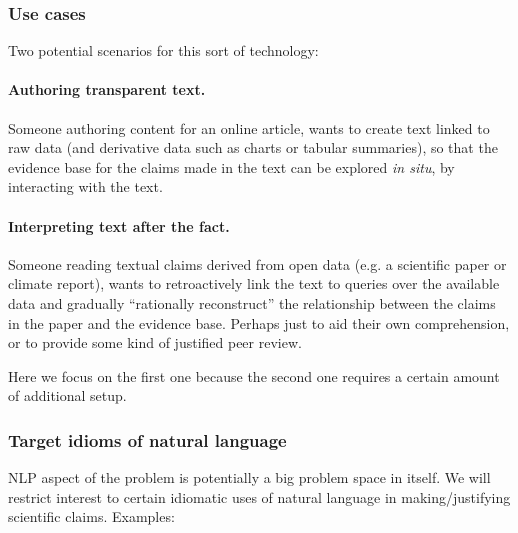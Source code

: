 \subsubsection{Use cases}
Two potential scenarios for this sort of technology:

\paragraph{Authoring transparent text.} Someone authoring content for an online article, wants to create text
linked to raw data (and derivative data such as charts or tabular summaries), so that the evidence base for
the claims made in the text can be explored \emph{in situ}, by interacting with the text.

\paragraph{Interpreting text after the fact.} Someone reading textual claims derived from open data (e.g. a
scientific paper or climate report), wants to retroactively link the text to queries over the available data
and gradually ``rationally reconstruct'' the relationship between the claims in the paper and the evidence
base. Perhaps just to aid their own comprehension, or to provide some kind of justified peer review.

\vspace{2mm}
\noindent Here we focus on the first one because the second one requires a certain amount of additional setup.

\subsubsection{Target idioms of natural language}

NLP aspect of the problem is potentially a big problem space in itself. We will restrict interest to certain
idiomatic uses of natural language in making/justifying scientific claims. Examples:



